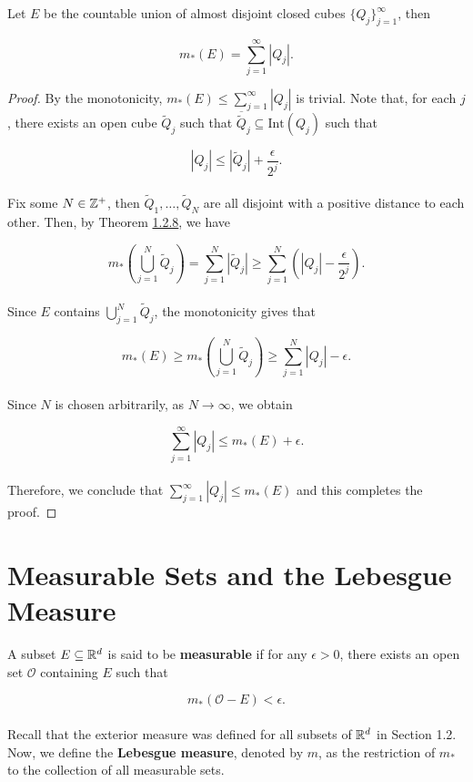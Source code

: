 \documentclass[12pt, a4paper, openany, twoside]{book}
\theoremstyle{definition}
\theoremstyle{remark}
\newcommand{\Int}{{\mathrm{Int}}}
\newcommand{\ov}{\overline}
\theoremstyle{plain}
\numberwithin{equation}{section}
\begin{document}
\vspace{5mm}
\begin{tcolorbox}[colback=yellow!10!white,colframe=red!75!black,title=Theorem 1.2.9]\label{Theorem 1.2.9}
    Let $E$ be the countable union of almost disjoint closed cubes $\{Q_j\}_{j=1}^{\infty}$, then

    \[m_*(E)=\sum_{j=1}^{\infty}{|Q_j|}.\]
\end{tcolorbox}
\begin{proof}
    By the monotonicity, $m_*(E)\leq\sum_{j=1}^{\infty}{|Q_j|}$ is trivial. Note that, for each $j$, there exists an open cube $\tilde{Q}_j$ such that $\ov{\tilde{Q}}_j\subseteq\Int{(Q_j)}$ such that 

    \[|Q_j|\leq |\tilde{Q}_j|+\frac{\epsilon}{2^j}.\]
    \\
    Fix some $N\in{\mathbb {Z}}^+$, then $\tilde{Q}_1,\dots,\tilde{Q}_N$ are all disjoint with a positive distance to each other. Then, by Theorem \hyperref[Theorem 1.2.8]{1.2.8}, we have 

    \[m_*\left(\bigcup_{j=1}^{N}{\tilde{Q}_j}\right)=\sum_{j=1}^{N}{|\tilde{Q}_j|}\geq \sum_{j=1}^{N}{\left(|Q_j|-\frac{\epsilon}{2^j}\right)}.\]
    \\
    Since $E$ contains $\bigcup_{j=1}^{N}{\tilde{Q}_j}$, the monotonicity gives that

    \[m_*(E)\geq m_*\left(\bigcup_{j=1}^{N}{\tilde{Q}_j}\right)\geq\sum_{j=1}^{N}{|Q_j|-\epsilon}.\]
    \\
    Since $N$ is chosen arbitrarily, as $N\rightarrow\infty$, we obtain
    
    \[\sum_{j=1}^{\infty}{|Q_j|}\leq m_*(E)+\epsilon.\]
    \\
    Therefore, we conclude that $\sum_{j=1}^{\infty}{|Q_j|}\leq m_*(E)$ and this completes the proof.
\end{proof}





\newpage
\section{Measurable Sets and the Lebesgue Measure}
\vspace{5mm}
\begin{tcolorbox}[colback=yellow!10!white,colframe=blue!75!black,title=Definition 1.3.1]\label{Definition 1.3.1}
    A subset $E\subseteq{\mathbb {R}}^d$ is said to be \textbf{measurable} if for any $\epsilon>0$, there exists an open set $\mathcal{O}$ containing $E$ such that 

    \[m_*(\mathcal{O}-E)<\epsilon.\]
    \\
    Recall that the exterior measure was defined for all subsets of ${\mathbb {R}}^d$ in Section 1.2. Now, we define the \textbf{Lebesgue measure}, denoted by $m$, as the restriction of $m_*$ to the collection of all measurable sets. 
\end{tcolorbox}
\vspace{5mm}
\end{document}
